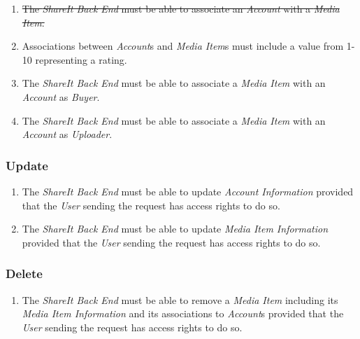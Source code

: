 \begin{enumerate}[label=\textbf{FR-\twodigits*},resume]
\item \st{The \textit{ShareIt Back End} must be able to associate an \textit{Account} with a \textit{Media Item}.} %

\item Associations between \textit{Account}s and \textit{Media Item}s must include a value from 1-10 representing a rating.

\item The \textit{ShareIt Back End} must be able to associate a \textit{Media Item} with an \textit{Account} as \textit{Buyer}.

\item The \textit{ShareIt Back End} must be able to associate a \textit{Media Item} with an \textit{Account} as \textit{Uploader}.
\end{enumerate}

\subsubsection{Update}
\begin{enumerate}[label=\textbf{FR-\twodigits*},resume]

\item The \textit{ShareIt Back End} must be able to update \textit{Account Information} provided that the \textit{User} sending the request has access rights to do so.

\item The \textit{ShareIt Back End} must be able to update \textit{Media Item Information} provided that the \textit{User} sending the request has access rights to do so.
\end{enumerate}

\subsubsection{Delete}
\begin{enumerate}[label=\textbf{FR-\twodigits*},resume]

\item The \textit{ShareIt Back End} must be able to remove a \textit{Media Item} including its \textit{Media Item Information} and its associations to \textit{Account}s provided that the \textit{User} sending the request has access rights to do so.

\end{enumerate}

